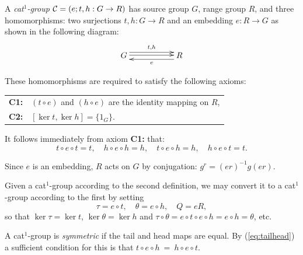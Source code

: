 \begin{defn} \label{defn:cat1-group2}
A \emph{cat$^1$-group} $\mathcal{C} = (e;t,h : G \to R)$  
has source group $G$, range group $R$, and three homomorphisms:  
two surjections  $t,h : G \to R$ and an embedding  $e : R \to G$ 
as shown in the following diagram:
$$
\xymatrix{
 G  \ar[rr] <1.0ex>^{t,h} \ar[rr] <0.2ex>
   &&  R \ar[ll] <1.0ex>^e \\
}
$$

\noindent
These homomorphisms are required to satisfy the following axioms:
\begin{center}
\begin{tabular}{r l}
\textbf{C1:}  &  $(t \circ e)$ and $(h \circ e)$ 
are the identity mapping on $R$, \\
\textbf{C2:}  &  $[\ker t, \ker h] = \{ 1_G \}$.
\end{tabular}
\end{center}
\end{defn} 

It follows immediately from axiom {\bf C1:} that: 
\begin{equation} \label{eq:tailhead}
t \circ e \circ t = t,\quad h \circ e \circ h = h,\quad 
t \circ e \circ h = h,\quad h \circ e \circ t = t.
\end{equation} 

Since $e$ is an embedding, $R$ acts on $G$ by conjugation: 
$g^r = (er)^{-1}g(er)$. 

Given a cat$^1$-group according to the second definition, 
we may convert it to a cat$^1$-group according to the first by setting 
$$
\tau = e \circ t,\quad
\theta = e \circ h,\quad 
Q = eR, 
$$
so that $\ker \tau = \ker t$, $\ker \theta = \ker h$ and 
$\tau\circ\theta = e \circ t \circ e \circ h = e \circ h = \theta$, etc. 

A cat$^1$-group is \emph{symmetric} if the tail and head maps are equal. 
By (\ref{eq:tailhead}) a sufficient condition for this is that 
$t \circ e \circ h ~=~ h \circ e \circ t$. 

